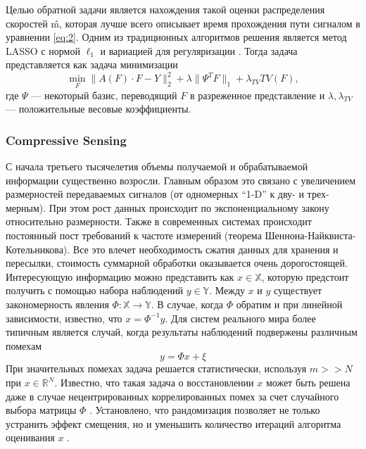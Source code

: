 \documentclass[14pt]{matmex-diploma}
\begin{document}
Целью обратной задачи является нахождения такой оценки распределения скоростей \^{m}, которая лучше всего описывает время прохождения пути сигналом в уравнении \eqref{eq:2}. Одним из традиционных алгоритмов решения является метод LASSO с нормой $\ell_1$ и вариацией для регуляризации \cite{hormati2010robust}. Тогда задача представляется как задача минимизации
\begin{equation}
\label{eq:lasso}
\min_F \| A(F) \cdot F - Y \|_2^2 + \lambda \| \Psi^T F \|_1 + \lambda_{TV} TV(F),
\end{equation}
где $\Psi$ --- некоторый базис, переводящий $F$ в разреженное представление и $\lambda, \lambda_{TV}$  --- положительные весовые коэффициенты.



\subsubsection{Compressive Sensing} \label{sec:cs_description}
С начала третьего тысячелетия объемы получаемой и обрабатываемой информации существенно возросли. Главным образом это связано с увеличением размерностей передаваемых сигналов (от одномерных ``1-D'' к дву- и  трех- мерным). При этом рост данных происходит по экспоненциальному закону относительно размерности. Также в современных системах происходит постоянный пост требований к частоте измерений (теорема Шеннона-Найквис\-та-Котель\-никова). Все это влечет необходимость сжатия данных для хранения и пересылки, стоимость суммарной обработки оказывается очень дорогостоящей\cite{граничин2010рандомизация}.
Интересующую информацию можно представить как $x \in \mathbb{X}$, которую предстоит получить с помощью набора наблюдений $y \in \mathbb{Y}$. Между $x$ и $y$ существует закономерность явления $\Phi:\mathbb{X}\to\mathbb{Y}$. В случае, когда $\Phi$ обратим и при линейной зависимости, известно, что $x = \Phi^{-1}y $. Для систем реального мира более типичным является случай, когда результаты наблюдений подвержены различным помехам \[y = \Phi x + \xi\]
При значительных помехах задача решается статистически, используя $m >> N$ при $x \in \mathbb{R}^N$. Известно, что такая задача о восстановлении $x$ может быть решена даже в случае нецентрированных коррелированных помех за счет случайного выбора матрицы $\Phi$ \cite{granichin2004linear}. Установлено, что рандомизация позволяет не только устранить эффект смещения, но и уменьшить количество итераций алгоритма оценивания $x$ \cite{граничин2003рандомизированные}. \\
\end{document}
